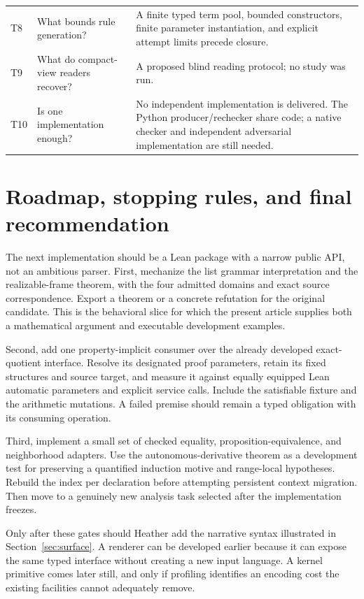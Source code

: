 \documentclass[11pt,letterpaper]{article}
\theoremstyle{definition}\newtheorem{definition}[theorem]{Definition}
\theoremstyle{remark}\newtheorem{remark}[theorem]{Remark}
\begin{document}
\begin{center}
\begin{longtable}{@{}P{0.07\textwidth}P{0.32\textwidth}P{0.53\textwidth}@{}}
T8 & What bounds rule generation? & A finite typed term pool, bounded constructors,
finite parameter instantiation, and explicit attempt limits precede closure.\\
T9 & What do compact-view readers recover? & A proposed blind reading protocol;
no study was run.\\
T10 & Is one implementation enough? & No independent implementation is delivered.
The Python producer/rechecker share code; a native checker and independent
adversarial implementation are still needed.\\
\end{longtable}
\end{center}

\section{Roadmap, stopping rules, and final recommendation}\label{sec:roadmap}

The next implementation should be a Lean package with a narrow public API,
not an ambitious parser. First, mechanize the list grammar interpretation and
the realizable-frame theorem, with the four admitted domains and exact source
correspondence. Export a theorem or a concrete refutation for the original
candidate. This is the behavioral slice for which the present article supplies
both a mathematical argument and executable development examples.

Second, add one property-implicit consumer over the already developed
exact-quotient interface. Resolve its designated proof parameters, retain its
fixed structures and source target, and measure it against equally equipped
Lean automatic parameters and explicit service calls. Include the satisfiable
fixture and the arithmetic mutations. A failed premise should remain a typed
obligation with its consuming operation.

Third, implement a small set of checked equality, proposition-equivalence,
and neighborhood adapters. Use the autonomous-derivative theorem as a
development test for preserving a quantified induction motive and range-local
hypotheses. Rebuild the index per declaration before attempting persistent
context migration. Then move to a genuinely new analysis task selected after
the implementation freezes.

Only after these gates should Heather add the narrative syntax illustrated in
Section~\ref{sec:surface}. A renderer can be developed earlier because it can
expose the same typed interface without creating a new input language.
A kernel primitive comes later still, and only if profiling identifies an
encoding cost the existing facilities cannot adequately remove.
\end{document}
